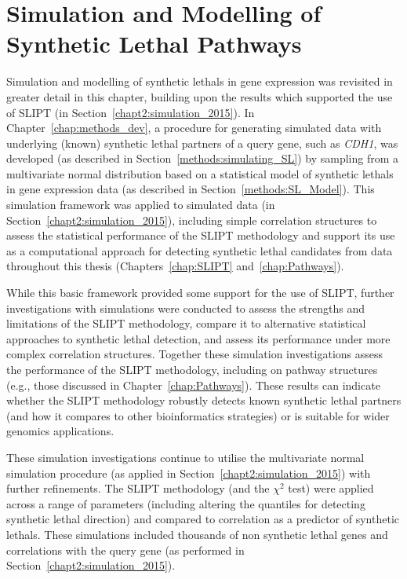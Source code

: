 \chapter{Simulation and Modelling of Synthetic Lethal Pathways}
\label{chap:simulation}

Simulation and modelling of \glspl{synthetic lethal} in \gls{gene expression} was revisited in greater detail in this chapter, building upon the results which supported the use of \gls{SLIPT} (in Section~\ref{chapt2:simulation_2015}). In Chapter~\ref{chap:methods_dev}, a procedure for generating simulated data with underlying (known) \gls{synthetic lethal} partners of a query gene, such as \textit{CDH1}, was developed (as described in Section~\ref{methods:simulating_SL}) by sampling from a multivariate normal distribution based on a statistical model of \glspl{synthetic lethal} in \gls{gene expression} data (as described in Section~\ref{methods:SL_Model}). This simulation framework was applied to simulated data (in Section~\ref{chapt2:simulation_2015}), including simple correlation structures to assess the statistical performance of the \gls{SLIPT} methodology and support its use as a computational approach for detecting \gls{synthetic lethal} candidates from  data throughout this thesis (Chapters~\ref{chap:SLIPT} and~\ref{chap:Pathways}). 

While this basic framework provided some support for the use of \gls{SLIPT}, further investigations with simulations were conducted to assess the strengths and limitations of the \gls{SLIPT} methodology, compare it to alternative statistical approaches to \gls{synthetic lethal} detection, and assess its performance under more complex correlation structures. Together these simulation investigations assess the performance of the \gls{SLIPT} methodology, including on pathway  structures (e.g., those discussed in Chapter~\ref{chap:Pathways}). These results can indicate whether the \gls{SLIPT} methodology robustly detects known \gls{synthetic lethal} partners (and how it compares to other \gls{bioinformatics} strategies) or is suitable for wider \glspl{genomic} applications.

These simulation investigations continue to utilise the multivariate normal simulation procedure (as applied in Section~\ref{chapt2:simulation_2015}) with further refinements. The \gls{SLIPT} methodology (and the $\chi^2$ test) were applied across a range of parameters (including altering the quantiles for detecting \gls{synthetic lethal} direction) and compared to correlation as a predictor of \glspl{synthetic lethal}. These simulations included thousands of non synthetic lethal genes and correlations with the query gene (as performed in Section~\ref{chapt2:simulation_2015}).

